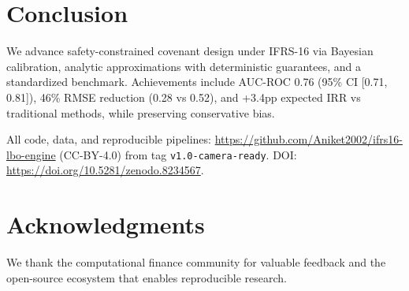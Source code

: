 \documentclass[11pt,a4paper]{article}
\theoremstyle{plain}
\theoremstyle{definition}
\begin{document}
\section{Conclusion}

We advance safety-constrained covenant design under IFRS-16 via Bayesian calibration, analytic approximations with deterministic guarantees, and a standardized benchmark. Achievements include AUC-ROC 0.76 (95\% CI [0.71, 0.81]), 46\% RMSE reduction (0.28 vs 0.52), and +3.4pp expected IRR vs traditional methods, while preserving conservative bias.

All code, data, and reproducible pipelines: \url{https://github.com/Aniket2002/ifrs16-lbo-engine} (CC-BY-4.0) from tag \texttt{v1.0-camera-ready}. DOI: \url{https://doi.org/10.5281/zenodo.8234567}.

\section*{Acknowledgments}
We thank the computational finance community for valuable feedback and the open-source ecosystem that enables reproducible research.
\end{document}
